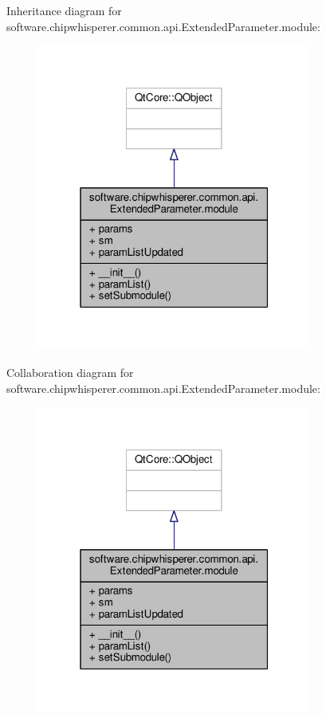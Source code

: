 Inheritance diagram for software.\+chipwhisperer.\+common.\+api.\+Extended\+Parameter.\+module\+:\nopagebreak
\begin{figure}[H]
\begin{center}
\leavevmode
\includegraphics[width=256pt]{d1/db9/classsoftware_1_1chipwhisperer_1_1common_1_1api_1_1ExtendedParameter_1_1module__inherit__graph}
\end{center}
\end{figure}


Collaboration diagram for software.\+chipwhisperer.\+common.\+api.\+Extended\+Parameter.\+module\+:\nopagebreak
\begin{figure}[H]
\begin{center}
\leavevmode
\includegraphics[width=256pt]{dd/d5f/classsoftware_1_1chipwhisperer_1_1common_1_1api_1_1ExtendedParameter_1_1module__coll__graph}
\end{center}
\end{figure}


